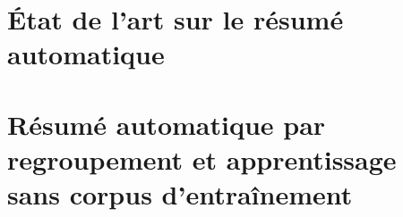 \documentclass[a4paper,12pt,oneside]{use/ESIthesis}
\begin{document}
\dominitoc


\clearpage


\clearpage
\newpage


\clearpage

\fancyhead[L]{\bfseries\nouppercase{\leftmark}}
\frontmatter

{}
\tableofcontents
\clearpage

\listoffigures
\clearpage

\listoftables
\clearpage

\mainmatter



\clearpage

\fancyhead[L]{\bfseries\nouppercase{\rightmark}}

\part{État de l'art sur le résumé automatique}


\clearpage


\clearpage


\clearpage

\part{Résumé automatique par regroupement et apprentissage sans corpus d'entraînement} %


\clearpage


\clearpage



\clearpage

\fancyhead[L]{\bfseries\nouppercase{\leftmark}}

\appendix



\clearpage



\end{document}
